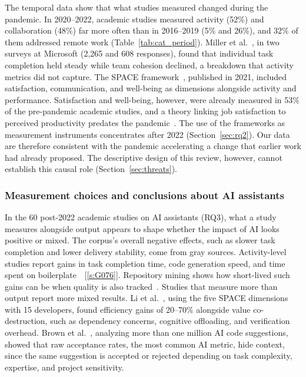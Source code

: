 \documentclass[preprint,number]{elsarticle}
\newcounter{study}
\newcommand{\refG}[1]{\ref{s:#1}}
\begin{document}
The temporal data show that what studies measured changed during the pandemic. In 2020--2022, academic studies measured activity (52\%) and collaboration (48\%) far more often than in 2016--2019 (5\% and 26\%), and 32\% of them addressed remote work (Table~\ref{tab:cat_period}). Miller et al.~\cite{P1503}, in two surveys at Microsoft (2,265 and 608 responses), found that individual task completion held steady while team cohesion declined, a breakdown that activity metrics did not capture. The SPACE framework~\cite{P1259}, published in 2021, included satisfaction, communication, and well-being as dimensions alongside activity and performance. Satisfaction and well-being, however, were already measured in 53\% of the pre-pandemic academic studies, and a theory linking job satisfaction to perceived productivity predates the pandemic~\cite{P2107}. The use of the frameworks as measurement instruments concentrates after 2022 (Section~\ref{sec:rq2}). Our data are therefore consistent with the pandemic accelerating a change that earlier work had already proposed. The descriptive design of this review, however, cannot establish this causal role (Section~\ref{sec:threats}).

\subsubsection{Measurement choices and conclusions about AI assistants}

In the 60 post-2022 academic studies on AI assistants (RQ3), what a study measures alongside output appears to shape whether the impact of AI looks positive or mixed. The corpus's overall negative effects, such as slower task completion and lower delivery stability, come from gray sources. Activity-level studies report gains in task completion time, code generation speed, and time spent on boilerplate~\cite{P0549, P2029}~[\refG{G076}]. Repository mining shows how short-lived such gains can be when quality is also tracked~\cite{P2032}. Studies that measure more than output report more mixed results. Li et al.~\cite{P1303}, using the five SPACE dimensions with 15 developers, found efficiency gains of 20--70\% alongside value co-destruction, such as dependency concerns, cognitive offloading, and verification overhead. Brown et al.~\cite{P1402}, analyzing more than one million AI code suggestions, showed that raw acceptance rates, the most common AI metric, hide context, since the same suggestion is accepted or rejected depending on task complexity, expertise, and project sensitivity.
\end{document}
